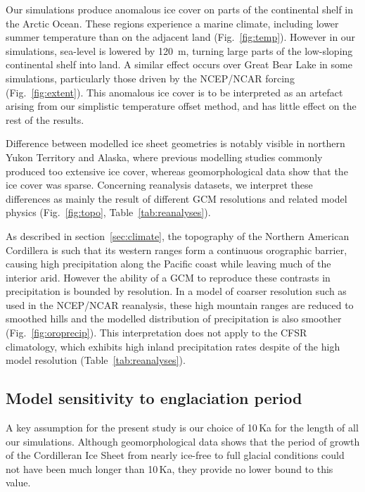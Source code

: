 Our simulations produce anomalous ice cover on parts of the continental shelf in the Arctic Ocean. These regions experience a marine climate, including lower summer temperature than on the adjacent land (Fig.~\ref{fig:temp}). However in our simulations, sea-level is lowered by 120~m, turning large parts of the low-sloping continental shelf into land. A similar effect occurs over Great Bear Lake in some simulations, particularly those driven by the NCEP/NCAR forcing (Fig.~\ref{fig:extent}). This anomalous ice cover is to be interpreted as an artefact arising from our simplistic temperature offset method, and has little effect on the rest of the results.

Difference between modelled ice sheet geometries is notably visible in northern Yukon Territory and Alaska, where previous modelling studies commonly produced too extensive ice cover, whereas geomorphological data show that the ice cover was sparse. Concerning reanalysis datasets, we interpret these differences as mainly the result of different GCM resolutions and related model physics (Fig.~\ref{fig:topo}, Table~\ref{tab:reanalyses}).

As described in section~\ref{sec:climate}, the topography of the Northern American Cordillera is such that its western ranges form a continuous orographic barrier, causing high precipitation along the Pacific coast while leaving much of the interior arid. However the ability of a GCM to reproduce these contrasts in precipitation is bounded by resolution. In a model of coarser resolution such as used in the NCEP/NCAR reanalysis, these high mountain ranges are reduced to smoothed hills and the modelled distribution of precipitation is also smoother (Fig.~\ref{fig:oroprecip}). This interpretation does not apply to the CFSR climatology, which exhibits high inland precipitation rates despite of the high model resolution (Table~\ref{tab:reanalyses}).

\subsection{Model sensitivity to englaciation period}

A key assumption for the present study is our choice of 10\,Ka for the length of all our simulations. Although geomorphological data shows that the period of growth of the Cordilleran Ice Sheet from nearly ice-free to full glacial conditions could not have been much longer than 10\,Ka, they provide no lower bound to this value.

